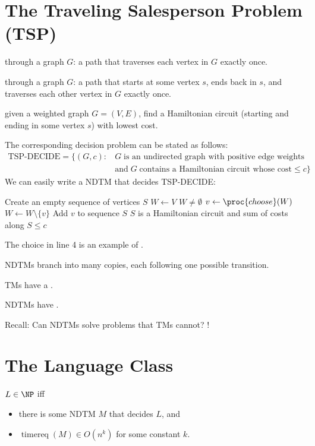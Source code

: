 \documentclass[a4paper]{report}
\newcommand{\bookref}[3]{\marginpar{\faBook{}~#1\\Chapter #2\\Section #3}}
\theoremstyle{definition}
\DeclareMathOperator*{\treq}{timereq}
\begin{document}
\section{The Traveling Salesperson Problem (TSP)}
\bookref{ER}{28}{28.2.3}
 through a graph $G$: a path that traverses each vertex in $G$ exactly once.

 through a graph $G$: a path that starts at some vertex $s$, ends back in $s$, and traverses each other vertex in $G$ exactly once.

 given a weighted graph $G=(V, E)$, find a Hamiltonian circuit (starting and ending in some vertex $s$) with lowest cost.

\bookref{ER}{27}{27.1}
The corresponding decision problem can be stated as follows:
%
\begin{align*}
\text{TSP-DECIDE} =  \{ (G, c) : & \; G \; \text{is an undirected graph with positive edge weights} \\ & \;\text{and} \; G \; \text{contains a Hamiltonian circuit whose cost} \leq c \}
\end{align*}
%
We can easily write a NDTM that decides TSP-DECIDE:

\begin{codebox}
\li Create an empty sequence of vertices $S$
\li $W \gets V$
\li \While $W \neq \emptyset$ \Do
  \li $v \gets \proc{choose}(W)$
  \li $W \gets W \setminus \{ v \}$
  \li Add $v$ to sequence $S$
\End
\li \If $S$ is a Hamiltonian circuit and sum of costs along $S \leq c$ 
  \li \Then \Return {}
\End
\li \Return {}
\end{codebox}

The choice in line 4 is an example of .

NDTMs branch into many copies, each following one possible transition.

TMs have a .

NDTMs have .

Recall: Can NDTMs solve problems that TMs cannot? !

\section{The Language Class \NP}
\bookref{ER}{28}{28.2}
$L \in \NP$ iff
\begin{itemize}
\item there is some NDTM $M$ that decides $L$, and
\item $\treq(M) \in O(n^k)$ for some constant $k$.
\end{itemize}
\end{document}
